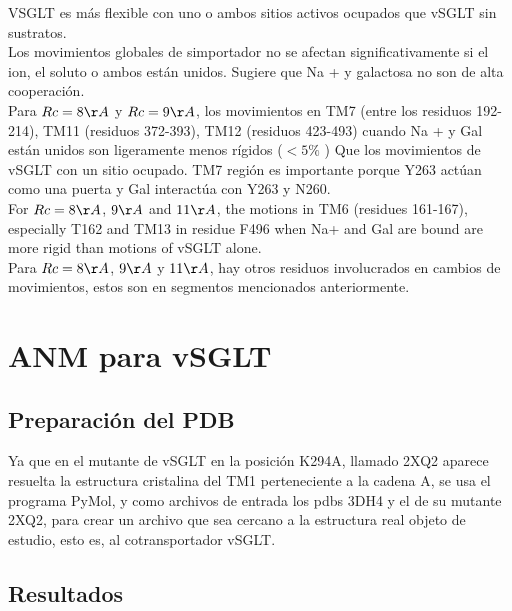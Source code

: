  VSGLT es más flexible con uno o ambos sitios activos ocupados que vSGLT sin sustratos.\\
Los movimientos globales de simportador no se afectan significativamente si el ion, el soluto o ambos están unidos. Sugiere que Na + y galactosa no son de alta cooperaci\'{o}n.\\
Para $Rc = 8\AA$ y $Rc = 9\AA$, los movimientos en TM7 (entre los residuos 192-214), TM11 (residuos 372-393), TM12 (residuos 423-493) cuando Na + y Gal están unidos son ligeramente menos rígidos ($<5\%$ ) Que los movimientos de vSGLT con un sitio ocupado. TM7 región es importante porque Y263 actúan como una puerta y Gal interactúa con Y263 y N260.\\
For $Rc=8\AA$,  $9\AA$ and $11\AA$, the motions in TM6 (residues 161-167), especially T162 and TM13 in residue F496  when Na+ and Gal are bound are more rigid than  motions of vSGLT alone.\\
Para $Rc = 8\AA$, $9\AA$ y $11\AA$, hay otros residuos involucrados en cambios de movimientos, estos son en segmentos mencionados anteriormente.\\

\section{ANM para vSGLT}
\subsection{Preparaci\'{o}n del PDB}
Ya que en el mutante de vSGLT en la posici\'{o}n K294A, llamado 2XQ2 aparece resuelta la estructura cristalina del TM1 perteneciente a la cadena A, se usa el programa PyMol, y como archivos de entrada los pdbs 3DH4 y el de su mutante 2XQ2, para crear un archivo que sea cercano a la estructura real objeto de estudio, esto es, al cotransportador vSGLT. 
\subsection{Resultados}

